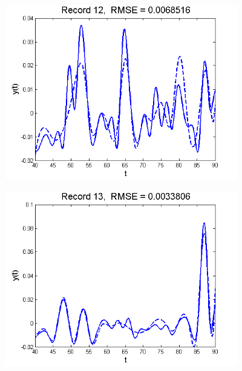\documentclass[11pt]{beamer}
\begin{document}
\begin{frame}

\begin{center}
\includegraphics[width=4in]{figs/SelTIC_fit12.png}
\end{center}

\end{frame}


\begin{frame}

\begin{center}
\includegraphics[width=4in]{figs/SelTIC_fit13.png}
\end{center}

\end{frame}

\end{document}
